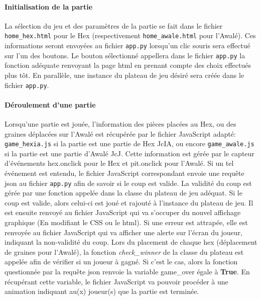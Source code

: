 \paragraph{Initialisation de la partie}
La sélection du jeu et des paramètres de la partie se fait dans le fichier \texttt{home\_hex.html} pour le Hex
(respectivement \texttt{home\_awale.html} pour l'Awalé). Ces informations seront envoyées au fichier \texttt{app.py}
lorsqu'un clic souris sera effectué sur l'un des boutons. Le bouton sélectionné appellera dans le fichier \texttt{app.py} la 
fonction adéquate renvoyant la page html en prenant compte des choix effectués plus tôt. En parallèle, une instance du plateau de
jeu désiré sera créée dans le fichier \texttt{app.py}. 

\paragraph{Déroulement d'une partie}
Lorsqu'une partie est jouée, l'information des pièces placées au Hex, ou des graines déplacées sur l'Awalé est récupérée par
le fichier JavaScript adapté: \texttt{game\_hexia.js} si la partie est une partie de Hex JcIA, ou encore 
\texttt{game\_awale.js} si la partie est une partie d'Awalé JcJ. Cette information est gérée par le capteur d'événements
hex.onclick pour le Hex et pit.onclick pour l'Awalé. Si un tel événement est entendu, le fichier JavaScript correspondant envoie une requête 
json au fichier \texttt{app.py} afin de savoir si le coup est valide. La validité du coup est gérée par une fonction appelée dans la classe du
plateau de jeu adéquat. Si le coup est valide, alors celui-ci est joué et rajouté à l'instance du plateau de jeu. Il est ensuite renvoyé au fichier 
JavaScript qui va s'occuper du nouvel affichage graphique (En modifiant le CSS ou le html). Si une erreur est attrapée, elle est renvoyée
au fichier JavaScript qui va afficher une alerte sur l'écran du joueur, indiquant la non-validité du coup. Lors du placement de chaque
hex (déplacement de graines pour l'Awalé), la fonction \textit{check\_winner} de la classe du plateau est appelée afin de vérifier si un joueur à 
gagné. Si c'est le cas, alors la fonction questionnée par la requête json renvoie la variable \textsf{game\_over} égale à \textbf{True}. 
En récupérant cette variable, le fichier JavaScript va pouvoir procéder à une animation indiquant au(x) joueur(s) que la partie est terminée.



